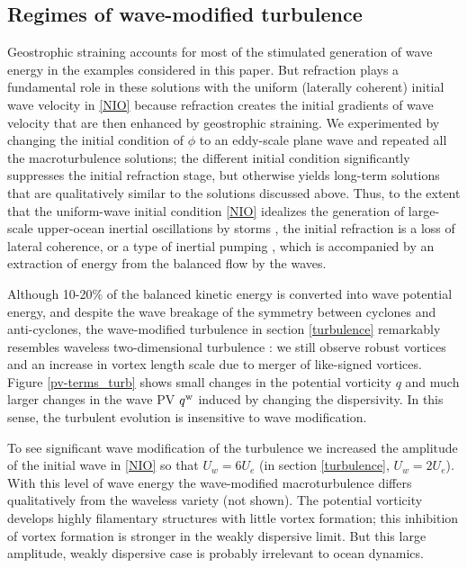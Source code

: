 \documentclass{jfm}
\begin{document}
\subsection{Regimes of wave-modified turbulence}
Geostrophic straining accounts for most of the stimulated generation of wave energy
in the examples considered in this paper. But refraction plays a fundamental role
in these solutions with the  uniform (laterally coherent) initial wave velocity in \eqref{NIO} because
refraction creates the initial gradients of wave velocity that are then enhanced
by geostrophic straining.  We experimented by changing the initial condition of $\phi$ to
an eddy-scale plane wave and repeated all the macroturbulence solutions; the different initial condition  significantly suppresses the initial refraction stage, but otherwise yields
long-term solutions that are qualitatively similar to the solutions discussed above.
Thus, to the extent that the uniform-wave initial condition  \eqref{NIO} idealizes the
generation of large-scale upper-ocean inertial oscillations by storms
\citep[e.g., ][]{moehlis_llewellynsmith2001,danioux_etal2015}, the initial refraction
is  a loss of lateral coherence, or a type of inertial pumping
\citep{young_benjelloul1997,klein_etal2004}, which
is accompanied by an extraction of energy from the balanced flow by the waves.

Although 10-20\% of the
balanced kinetic energy is converted into wave potential energy, and despite the wave breakage of the symmetry between  cyclones and anti-cyclones, the wave-modified turbulence in section \ref{turbulence} remarkably resembles waveless two-dimensional turbulence  \citep[e.g., ][]{mcwilliams1984}: we still observe robust vortices and an increase in vortex length scale   due to  merger of like-signed vortices. Figure \ref{pv-terms_turb} shows  small changes in the potential vorticity $q$  and much  larger changes in the wave PV $q^{\mathrm{w}}$ induced by changing the dispersivity. In this sense, the turbulent evolution is  insensitive to wave modification.

To see significant wave modification of the turbulence we increased the amplitude of the  initial wave in \eqref{NIO} so that  $U_w = 6 U_e$ (in section \ref{turbulence}, $U_w=2 U_e$).  With this level of wave energy the wave-modified macroturbulence differs qualitatively from the waveless variety (not shown). The potential vorticity develops highly filamentary structures with little vortex formation; this inhibition of vortex formation is  stronger
in the weakly dispersive limit. But this large amplitude, weakly dispersive case is probably irrelevant to ocean dynamics.
\end{document}
